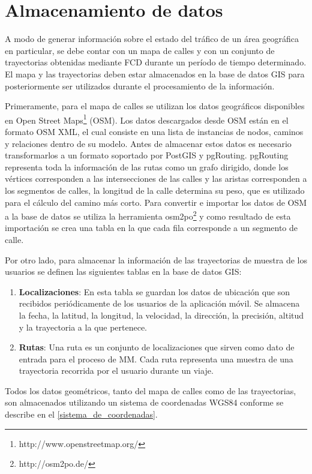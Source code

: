 \section{Almacenamiento de datos}
\label{base-de-datos}

A modo de generar información sobre el estado del tráfico de un área geográfica en particular, se debe contar con un mapa de calles y con un conjunto de trayectorias obtenidas mediante FCD durante un período de tiempo determinado. El mapa y las trayectorias deben estar almacenados en la base de datos GIS para posteriormente ser utilizados durante el procesamiento de la información.

Primeramente, para el mapa de calles se utilizan los datos geográficos disponibles en Open Street Maps\footnote{http://www.openstreetmap.org/} (OSM). Los datos descargados desde OSM están en el formato OSM XML, el cual consiste en una lista de instancias de nodos, caminos y relaciones dentro de su modelo. Antes de almacenar estos datos es necesario transformarlos a un formato soportado por PostGIS y pgRouting. pgRouting representa toda la información de las rutas como un grafo dirigido, donde los vértices corresponden a las intersecciones de las calles y las aristas corresponden a los segmentos de calles, la longitud de la calle determina su peso, que es utilizado para el cálculo del camino más corto. Para convertir e importar los datos de OSM a la base de datos se utiliza la herramienta osm2po\footnote{http://osm2po.de/} y como resultado de esta importación se crea una tabla en la que cada fila corresponde a un segmento de calle. 

Por otro lado, para almacenar la información de las trayectorias de muestra de los usuarios se definen las siguientes tablas en la base de datos GIS:
\begin{enumerate}
	\item \textbf{Localizaciones}: En esta tabla se guardan los datos de ubicación que son recibidos periódicamente de los usuarios de la aplicación móvil. Se almacena la fecha, la latitud, la longitud, la velocidad, la dirección, la precisión, altitud y la trayectoria a la que pertenece.
	\item \textbf{Rutas}: Una ruta es un conjunto de localizaciones que sirven como dato de entrada para el proceso de MM. Cada ruta representa una muestra de una trayectoria recorrida por el usuario durante un viaje.
\end{enumerate}
Todos los datos geométricos, tanto del mapa de calles como de las trayectorias, son almacenados utilizando un sistema de coordenadas WGS84 conforme se describe en el \cref{sistema_de_coordenadas}.

